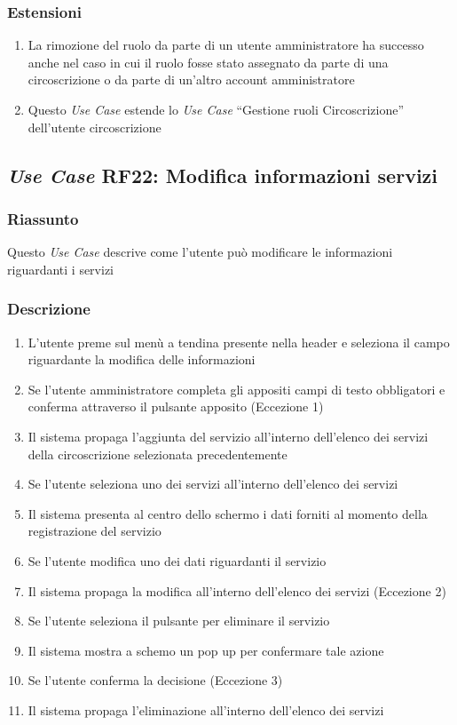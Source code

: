         \subsubsection{Estensioni}
            \begin{enumerate}
                \item La rimozione del ruolo da parte di un utente amministratore ha successo anche nel caso in cui il ruolo fosse stato assegnato da parte di una circoscrizione o da parte di un'altro account amministratore
                \item Questo \textit{Use Case} estende lo \textit{Use Case} ``Gestione ruoli Circoscrizione'' dell'utente circoscrizione
            \end{enumerate}

    \subsection{\textit{Use Case} RF22: Modifica informazioni servizi}
        \subsubsection{Riassunto}
        Questo \textit{Use Case} descrive come l'utente può modificare le informazioni riguardanti i servizi
        \subsubsection{Descrizione}
            \begin{enumerate}
                \item L'utente preme sul menù a tendina presente nella header e seleziona il campo riguardante la modifica delle informazioni
                \item Se l'utente amministratore completa gli appositi campi di testo obbligatori e conferma attraverso il pulsante apposito (Eccezione 1)
                \item Il sistema propaga l'aggiunta del servizio all'interno dell'elenco dei servizi della circoscrizione selezionata precedentemente
                \item Se l'utente seleziona uno dei servizi all'interno dell'elenco dei servizi
                \item Il sistema presenta al centro dello schermo i dati forniti al momento della registrazione del servizio
                \item Se l'utente modifica uno dei dati riguardanti il servizio
                \item Il sistema propaga la modifica all'interno dell'elenco dei servizi (Eccezione 2)
                \item Se l'utente seleziona il pulsante per eliminare il servizio
                \item Il sistema mostra a schemo un pop up per confermare tale azione
                \item Se l'utente conferma la decisione (Eccezione 3)
                \item Il sistema propaga l'eliminazione all'interno dell'elenco dei servizi
            \end{enumerate}
